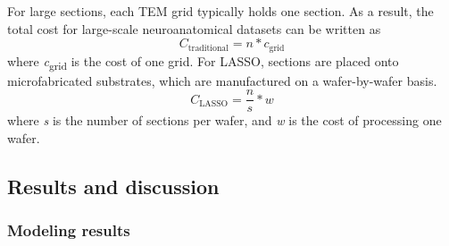 \documentclass{article}
\begin{document}
For large sections, each TEM grid typically holds one section. As a result, the total cost for large-scale neuroanatomical datasets can be written as
\begin{equation*} C_{\text{traditional}} = n \ast c_{\text{grid}} \tag{6} \end{equation*}
where \emph{c}\textsubscript{grid} is the cost of one grid. For LASSO, sections are placed onto microfabricated substrates, which are manufactured on a wafer-by-wafer basis.
\begin{equation*} C_{\text{LASSO}} = \frac{n}{s} \ast w \tag{7} \end{equation*}
where \emph{s} is the number of sections per wafer, and \emph{w} is the cost of processing one wafer.

\subsection*{Results and discussion}
\subsubsection*{Modeling results}
\end{document}

